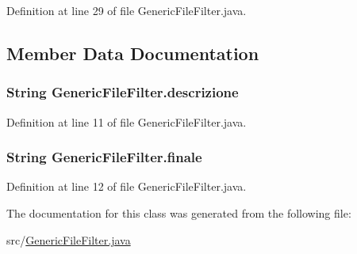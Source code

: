 Definition at line 29 of file Generic\-File\-Filter.\-java.



\subsection{Member Data Documentation}
\hypertarget{class_generic_file_filter_a9953e3b3aa3dee91452cb9c2ad80822b}{
\subsubsection[{descrizione}]{\setlength{\rightskip}{0pt plus 5cm}String {\bf Generic\-File\-Filter.\-descrizione}}}\label{class_generic_file_filter_a9953e3b3aa3dee91452cb9c2ad80822b}


Definition at line 11 of file Generic\-File\-Filter.\-java.

\hypertarget{class_generic_file_filter_a9468f04e6ea80d41e6bc69b59769b751}{
\subsubsection[{finale}]{\setlength{\rightskip}{0pt plus 5cm}String {\bf Generic\-File\-Filter.\-finale}}}\label{class_generic_file_filter_a9468f04e6ea80d41e6bc69b59769b751}


Definition at line 12 of file Generic\-File\-Filter.\-java.



The documentation for this class was generated from the following file\-:\begin{DoxyCompactItemize}
\item 
src/\hyperlink{_generic_file_filter_8java}{Generic\-File\-Filter.\-java}\end{DoxyCompactItemize}
